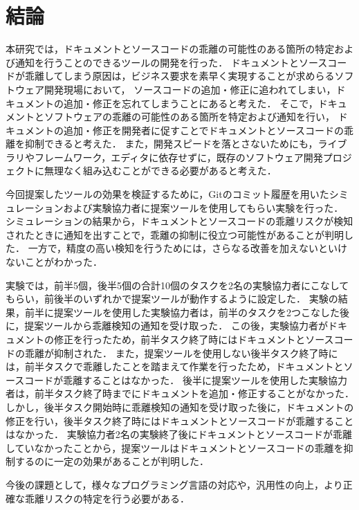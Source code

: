 \chapter{結論}
本研究では，ドキュメントとソースコードの乖離の可能性のある箇所の特定および通知を行うことのできるツールの開発を行った．
ドキュメントとソースコードが乖離してしまう原因は，ビジネス要求を素早く実現することが求めらるソフトウェア開発現場において，
ソースコードの追加・修正に追われてしまい，ドキュメントの追加・修正を忘れてしまうことにあると考えた．
そこで，ドキュメントとソフトウェアの乖離の可能性のある箇所を特定および通知を行い，
ドキュメントの追加・修正を開発者に促すことでドキュメントとソースコードの乖離を抑制できると考えた．
また，開発スピードを落とさないためにも，ライブラリやフレームワーク，エディタに依存せずに，既存のソフトウェア開発プロジェクトに無理なく組み込むことができる必要があると考えた．

今回提案したツールの効果を検証するために，Gitのコミット履歴を用いたシミュレーションおよび実験協力者に提案ツールを使用してもらい実験を行った．
シミュレーションの結果から，ドキュメントとソースコードの乖離リスクが検知されたときに通知を出すことで，乖離の抑制に役立つ可能性があることが判明した．
一方で，精度の高い検知を行うためには，さらなる改善を加えないといけないことがわかった．

実験では，前半5個，後半5個の合計10個のタスクを2名の実験協力者にこなしてもらい，前後半のいずれかで提案ツールが動作するように設定した．
実験の結果，前半に提案ツールを使用した実験協力者は，前半のタスクを2つこなした後に，提案ツールから乖離検知の通知を受け取った．
この後，実験協力者がドキュメントの修正を行ったため，前半タスク終了時にはドキュメントとソースコードの乖離が抑制された．
また，提案ツールを使用しない後半タスク終了時には，前半タスクで乖離したことを踏まえて作業を行ったため，ドキュメントとソースコードが乖離することはなかった．
後半に提案ツールを使用した実験協力者は，前半タスク終了時までにドキュメントを追加・修正することがなかった．
しかし，後半タスク開始時に乖離検知の通知を受け取った後に，ドキュメントの修正を行い，後半タスク終了時にはドキュメントとソースコードが乖離することはなかった．
実験協力者2名の実験終了後にドキュメントとソースコードが乖離していなかったことから，提案ツールはドキュメントとソースコードの乖離を抑制するのに一定の効果があることが判明した．

今後の課題として，様々なプログラミング言語の対応や，汎用性の向上，より正確な乖離リスクの特定を行う必要がある．